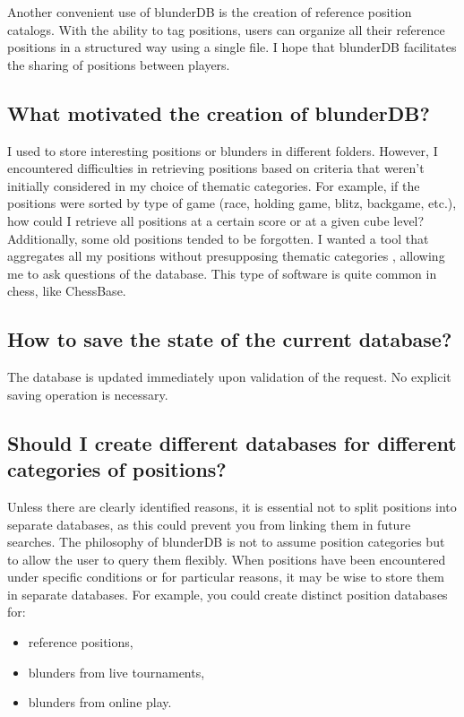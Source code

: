 \documentclass[letterpaper,10pt,english]{sphinxmanual}
\begin{document}
\sphinxAtStartPar
Another convenient use of blunderDB is the creation of reference position catalogs. With the ability to tag positions, users can organize all their reference positions in a structured way using a single file. I hope that blunderDB facilitates the sharing of positions between players.


\subsection{What motivated the creation of blunderDB?}
\label{\detokenize{faq:qu-est-ce-qui-a-motive-la-creation-de-blunderdb}}
\sphinxAtStartPar
I used to store interesting positions or blunders in different folders. However, I encountered difficulties in retrieving positions based on criteria that weren’t initially considered in my choice of thematic categories. For example, if the positions were sorted by type of game (race, holding game, blitz, backgame, etc.), how could I retrieve all positions at a certain score or at a given cube level? Additionally, some old positions tended to be forgotten. I wanted a tool that aggregates all my positions without presupposing thematic categories , allowing me to ask questions of the database. This type of software is quite common in chess, like ChessBase.


\subsection{How to save the state of the current database?}
\label{\detokenize{faq:comment-sauvegarder-la-base-de-donnees-courante}}
\sphinxAtStartPar
The database is updated immediately upon validation of the request. No explicit saving operation is necessary.


\subsection{Should I create different databases for different categories of positions?}
\label{\detokenize{faq:dois-je-creer-differentes-bases-de-donnees-pour-differentes-categories-de-positions}}
\sphinxAtStartPar
Unless there are clearly identified reasons, it is essential not to split positions into separate databases, as this could prevent you from linking them in future searches. The philosophy of blunderDB is not to assume position categories  but to allow the user to query them flexibly. When positions have been encountered under specific conditions or for particular reasons, it may be wise to store them in separate databases. For example, you could create distinct position databases for:
\begin{itemize}
\item {} 
\sphinxAtStartPar
reference positions,

\item {} 
\sphinxAtStartPar
blunders from live tournaments,

\item {} 
\sphinxAtStartPar
blunders from online play.

\end{itemize}
\end{document}
